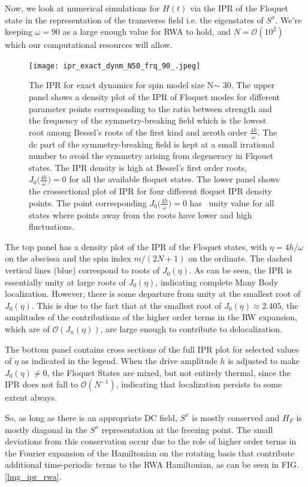 \documentclass[%
 reprint,
 amsmath,amssymb,
 aps,
]{revtex4-2}
\begin{document}
Now, we look at numerical simulations for $H(t)$ via the IPR of the Floquet state in the representation of the transverse field i.e. the eigenstates of $S^x$. We're keeping $\omega = 90$ as a large enough value for RWA to hold, and $N=\mathcal{O}(10^2)$ which our computational resources will allow. 

\begin{figure}[ht!]
	\centering
	\texttt{[image: ipr\_exact\_dynm\_N50\_frq\_90\_.jpeg]}
	\caption{The IPR for exact dynamics for spin model size N$\sim$ 30. The upper panel shows a density plot of the IPR of Floquet modes for different parameter points corresponding to the ratio between strength and the frequency of the symmetry-breaking field which is the lowest root among Bessel's roots of the first kind and zeroth order $\frac{4h}{\omega}$. The dc part of the symmetry-breaking field is kept at a small irrational number to avoid the symmetry arising from degeneracy in Flqouet states. The IPR density is high at Bessel's first order roots, $J_0\Big(\frac{4h}{\omega}\Big)=0$ for all the available floquet states. The lower panel shows the crossectional plot of IPR for four different floquet IPR density points. The point corresponding $J_0\Big(\frac{4h}{\omega}\Big)=0$ has ~unity value for all states where points away from the roots have lower and high fluctuations.}
	\label{lmg_ipr_exact}
\end{figure}
The top panel has a density plot of the IPR of the Floquet states, with $\eta=4h/\omega$ on the abscissa and the spin index $m/(2N+1)$ on the ordinate. The dashed vertical lines (blue) correspond to roots of $J_0(\eta)$. As can be seen, the IPR is essentially unity at large roots of $J_0(\eta)$, indicating complete Many Body localization. However, there is some departure from unity at the smallest root of $J_0(\eta)$. This is due to the fact that at the smallest root of $J_0(\eta)\approx 2.405$, the amplitudes of the contributions of the higher order terms in the RW expansion, which are of $\mathcal{O}(J_n(\eta))$, are large enough to contribute to delocalization.

The bottom panel contains cross sections of the full IPR plot for selected values of $\eta$ as indicated in the legend. When the drive amplitude $h$ is adjusted to make $J_0(\eta)\neq 0$, the Floquet States are mixed, but not entirely thermal, since the IPR does not fall to $\mathcal{O}(N^{-1})$, indicating that localization persists to some extent always.

So, as long as there is an appropriate DC field, $S^x$ is mostly conserved and $H_F$ is mostly diagonal in the $S^x$ representation at the freezing point. The small deviations from this conservation occur due to the role of higher order terms in the Fourier expansion of the Hamiltonian on the rotating basis that contribute additional time-periodic terms to the RWA Hamiltonian, as can be seen in FIG.\ref{lmg_ipr_rwa}.
\end{document}
